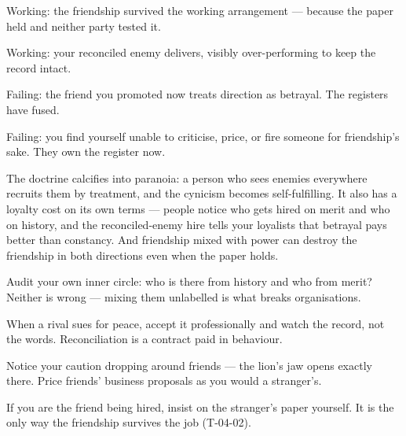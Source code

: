 \begin{feedback}
  \item Working: the friendship survived the working arrangement --- because the paper held and neither party tested it.
  \item Working: your reconciled enemy delivers, visibly over-performing to keep the record intact.
  \item Failing: the friend you promoted now treats direction as betrayal. The registers have fused.
  \item Failing: you find yourself unable to criticise, price, or fire someone for friendship's sake. They own the register now.
\end{feedback}
\begin{failure}
The doctrine calcifies into paranoia: a person who sees enemies everywhere recruits them by treatment, and the cynicism becomes self-fulfilling. It also has a loyalty cost on its own terms --- people notice who gets hired on merit and who on history, and the reconciled-enemy hire tells your loyalists that betrayal pays better than constancy. And friendship mixed with power can destroy the friendship in both directions even when the paper holds.
\end{failure}
\begin{countermeasures}
  \item Audit your own inner circle: who is there from history and who from merit? Neither is wrong --- mixing them unlabelled is what breaks organisations.
  \item When a rival sues for peace, accept it professionally and watch the record, not the words. Reconciliation is a contract paid in behaviour.
  \item Notice your caution dropping around friends --- the lion's jaw opens exactly there. Price friends' business proposals as you would a stranger's.
  \item If you are the friend being hired, insist on the stranger's paper yourself. It is the only way the friendship survives the job (T-04-02).
\end{countermeasures}

\seesources
{}
